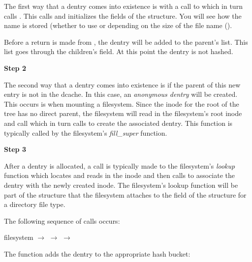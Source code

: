 \vspace{0.25cm}
\noindent
The first way that a dentry comes into existence is with a call to  which in turn calls . This calls  and initializes the fields of the  structure. You will see how the name is stored (whether to use  or  depending on the size of the file name ().

Before a return is made from , the dentry will be added to the parent's  list. This list goes through the children's  field. At this point the dentry is not hashed.

\vspace{0.25cm}
\noindent
\textbf{Step 2}  %

\vspace{0.25cm}
\noindent
The second way that a dentry comes into existence is if the parent of this new entry is not in the dcache. In this case, an \textit{anonymous dentry} will be created. This occurs is when mounting a filesystem. Since the inode for the root of the tree has no direct parent, the filesystem will read in the filesystem's root inode and call  which in turn calls  to create the associated dentry. This function is typically called by the filesystem's \textit{fill\_super} function.

\vspace{0.25cm}
\noindent
\textbf{Step 3}  %

\vspace{0.25cm}
\noindent
After a dentry is allocated, a call is typically made to the filesystem's \textit{lookup} function which locates and reads in the inode and then calls  to associate the dentry with the newly created inode. The filesystem's lookup function will be part of the  structure that the filesystem attaches to the  field of the  structure for a directory file type.

The following sequence of calls occurs:

\small
\bigskip 
filesystem $\rightarrow$  $\rightarrow$   $\rightarrow$ 
    
\bigskip
\normalsize
\noindent
The function  adds the dentry to the appropriate hash bucket:

